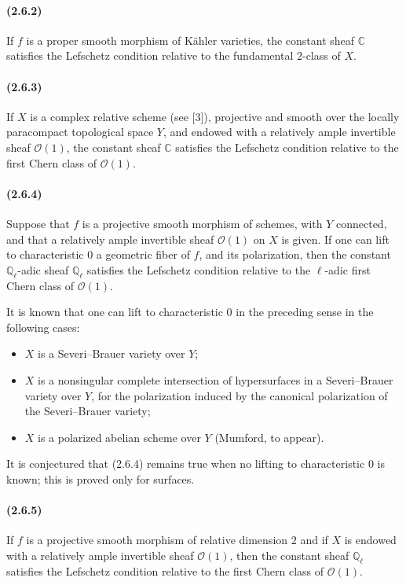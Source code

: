\documentclass[10pt]{article}
\providecommand{\C}{\mathbb C}
\providecommand{\Ql}{\mathbb Q_\ell}
\begin{document}
\paragraph{(2.6.2)} If $f$ is a proper smooth morphism of Kähler varieties, the constant sheaf $\C$ satisfies the Lefschetz condition relative to the fundamental $2$-class of $X$.

\paragraph{(2.6.3)} If $X$ is a complex relative scheme (see [3]), projective and smooth over the locally paracompact topological space $Y$, and endowed with a relatively ample invertible sheaf $\mathcal O(1)$, the constant sheaf $\C$ satisfies the Lefschetz condition relative to the first Chern class of $\mathcal O(1)$.

\paragraph{(2.6.4)} Suppose that $f$ is a projective smooth morphism of schemes, with $Y$ connected, and that a relatively ample invertible sheaf $\mathcal O(1)$ on $X$ is given. If one can lift to characteristic $0$ a geometric fiber of $f$, and its polarization, then the constant $\Ql$-adic sheaf $\Ql$ satisfies the Lefschetz condition relative to the $\ell$-adic first Chern class of $\mathcal O(1)$.

It is known that one can lift to characteristic $0$ in the preceding sense in the following cases:
\begin{itemize}
\item $X$ is a Severi--Brauer variety over $Y$;
\item $X$ is a nonsingular complete intersection of hypersurfaces in a Severi--Brauer variety over $Y$, for the polarization induced by the canonical polarization of the Severi--Brauer variety;
\item $X$ is a polarized abelian scheme over $Y$ (Mumford, to appear).
\end{itemize}
It is conjectured that (2.6.4) remains true when no lifting to characteristic $0$ is known; this is proved only for surfaces.

\paragraph{(2.6.5)} If $f$ is a projective smooth morphism of relative dimension $2$ and if $X$ is endowed with a relatively ample invertible sheaf $\mathcal O(1)$, then the constant sheaf $\Ql$ satisfies the Lefschetz condition relative to the first Chern class of $\mathcal O(1)$.
\end{document}
